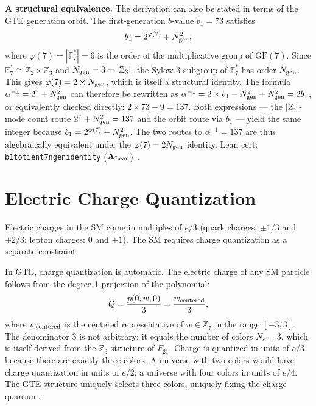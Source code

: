 \documentclass[11pt,a4paper]{article}
\newcommand{\lean}[1]{%
  \penalty-100
  \begingroup\def\_{\textunderscore\allowbreak}\texttt{#1}\endgroup}
\newcommand{\CatAL}{\ensuremath{\mathbf{A}_{\rm Lean}}}
\begin{document}
\textbf{A structural equivalence.}
The derivation can also be stated in terms of the GTE generation orbit.
The first-generation $b$-value $b_1 = 73$ satisfies
\[
  b_1 = 2^{\varphi(7)} + N_{\rm gen}^2,
\]
where $\varphi(7) = |\mathbb{F}_7^*| = 6$ is the order of the multiplicative group of
$\mathrm{GF}(7)$.  Since $\mathbb{F}_7^* \cong \mathbb{Z}_2 \times \mathbb{Z}_3$ and
$N_{\rm gen} = 3 = |\mathbb{Z}_3|$, the Sylow-3 subgroup of $\mathbb{F}_7^*$ has order $N_{\rm gen}$.
This gives $\varphi(7) = 2 \times N_{\rm gen}$, which is itself a structural identity.
The formula $\alpha^{-1} = 2^7 + N_{\rm gen}^2$ can therefore be rewritten as
$\alpha^{-1} = 2 \times b_1 - N_{\rm gen}^2 + N_{\rm gen}^2 = 2b_1$, or equivalently
checked directly: $2 \times 73 - 9 = 137$.
Both expressions --- the $|Z_7|$-mode count route $2^7 + N_{\rm gen}^2 = 137$ and the
orbit route via $b_1$ --- yield the same integer because $b_1 = 2^{\varphi(7)} + N_{\rm gen}^2$.
The two routes to $\alpha^{-1} = 137$ are thus algebraically equivalent under the
$\varphi(7) = 2N_{\rm gen}$ identity.
Lean cert: \lean{b1\_totient7\_ngen\_identity} (\CatAL)~\cite{SpivackGTECompleteFramework}.

\section{Electric Charge Quantization}
\label{sec:charge}

Electric charges in the SM come in multiples of $e/3$
(quark charges: $\pm 1/3$ and $\pm 2/3$; lepton charges: $0$ and $\pm 1$).
The SM requires charge quantization as a separate constraint.

In GTE, charge quantization is automatic.
The electric charge of any SM particle follows from the degree-1 projection
of the polynomial:
\begin{equation}
  Q = \frac{p(0, w, 0)}{3} = \frac{w_{\rm centered}}{3},
  \label{eq:charge}
\end{equation}
where $w_{\rm centered}$ is the centered representative of $w \in \mathbb{Z}_7$
in the range $[-3, 3]$.
The denominator 3 is not arbitrary: it equals the number of colors $N_c = 3$,
which is itself derived from the $\mathbb{Z}_3$ structure of $F_{21}$.
Charge is quantized in units of $e/3$ because there are exactly three colors.
A universe with two colors would have charge quantization in units of $e/2$;
a universe with four colors in units of $e/4$.
The GTE structure uniquely selects three colors, uniquely fixing the charge quantum.
\end{document}
